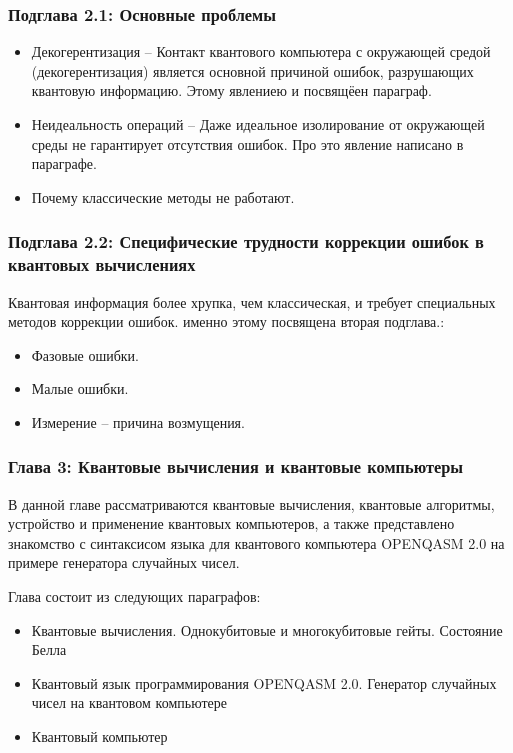 \documentclass{beamer}
\begin{document}
	\begin{frame}\frametitle{Подглава 2.1: Основные проблемы}
		
		\begin{itemize}
			\item \justifying Декогерентизация -- 	Контакт квантового компьютера с окружающей средой (декогерентизация) является основной причиной ошибок, разрушающих квантовую информацию. Этому явлениею и посвящёен параграф.
			\item \justifying Неидеальность операций -- Даже идеальное изолирование от окружающей среды не гарантирует отсутствия ошибок. Про это явление написано в параграфе.
			\item \justifying Почему классические методы не работают.
			
		\end{itemize}
		
	\end{frame}
	
	\begin{frame}\frametitle{Подглава 2.2: Специфические трудности коррекции ошибок в квантовых вычислениях}
		\justifying
		Квантовая информация более хрупка, чем классическая, и требует специальных методов коррекции ошибок. именно этому  посвящена вторая подглава.:
		\begin{itemize}
			\item \justifying Фазовые ошибки.
			\item \justifying Малые ошибки.
			\item \justifying Измерение – причина возмущения.
			
		\end{itemize}
		
	\end{frame}
	
	\begin{frame}
		\frametitle{Глава 3: Квантовые вычисления и квантовые компьютеры}
		\justifying В данной главе рассматриваются квантовые вычисления, квантовые алгоритмы, устройство и применение квантовых компьютеров, а также представлено знакомство с синтаксисом языка для квантового компьютера OPENQASM 2.0 на примере генератора случайных чисел.
		
		Глава состоит из следующих параграфов:
		\begin{itemize}
			\item \justifying Квантовые вычисления. Однокубитовые и многокубитовые гейты. Состояние Белла
			\item \justifying Квантовый язык программирования OPENQASM 2.0. Генератор случайных чисел на квантовом компьютере
			\item \justifying Квантовый компьютер
		\end{itemize}
	\end{frame}
	
\end{document}
